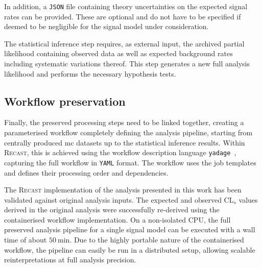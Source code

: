 In addition, a \texttt{JSON} file containing theory uncertainties on the expected signal rates can be provided. These are optional and do not have to be specified if deemed to be negligible for the signal model under consideration.

The statistical inference step requires, as external input, the archived partial likelihood containing observed data as well as expected background rates including systematic variations thereof. This step generates a new full analysis likelihood and performs the necessary hypothesis tests.  

\subsection{Workflow preservation}

Finally, the preserved processing steps need to be linked together, creating a parameterised workflow completely defining the analysis pipeline, starting from centrally produced \gls{mc} datasets up to the statistical inference results. Within \textsc{Recast}, this is achieved using the workflow description language \texttt{yadage}~\cite{yadage:2017frf}, capturing the full workflow in \texttt{YAML} format. The workflow uses the job templates and defines their processing order and dependencies.

The \textsc{Recast} implementation of the analysis presented in this work has been validated against original analysis inputs. The expected and observed CL$_s$ values derived in the original analysis were successfully re-derived using the containerised workflow implementation. On a non-isolated CPU, the full preserved analysis pipeline for a single signal model can be executed with a wall time of about $\SI{50}{\minute}$. Due to the highly portable nature of the containerised workflow, the pipeline can easily be run in a distributed setup, allowing scalable reinterpretations at full analysis precision. 


